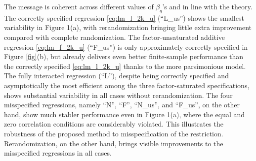 \documentclass[11pt]{article}
\theoremstyle{definition}
\begin{document}
The message is coherent across different values of $\beta_q$'s and in line with the theory. The correctly specified regression \eqref{eq:lm_l_2k_u} (``L\_us'') shows the smallest variability in Figure 1(a), with rerandomization %
bringing little extra improvement compared with complete randomization. 
The factor-unsaturated additive regression \eqref{eq:lm_f_2k_u} (``F\_us'') is only approximately correctly specified in Figure \ref{fig}(b), but already delivers even better finite-sample performance than the correctly specified \eqref{eq:lm_l_2k_u} thanks to the more parsimonious model. 
The fully interacted regression (``L''), despite being correctly specified and asymptotically the most efficient among the three factor-saturated specifications, shows substantial variability in all cases without rerandomization. %
The four misspecified regressions, namely ``N'', ``F'', ``N\_us'', and ``F\_us'', on the other hand, show much stabler performance even in Figure 1(a), where the equal and zero correlation conditions are considerably violated.
This illustrates the robustness of the proposed method to misspecification of the restriction. 
Rerandomization, %
on the other hand, brings visible improvements to the misspecified regressions in all cases. 
\end{document}
